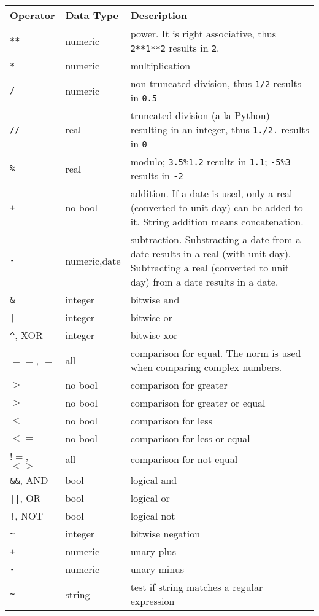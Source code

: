 \begin{tabular}{lp{2cm}p{10cm}}
  Operator & Data Type & Description \\ \hline
  \texttt{**} & numeric & power. It is right associative, thus \texttt{2**1**2} results in
  \texttt{2}. \\
  \texttt{*} & numeric & multiplication \\
  \texttt{/} & numeric & non-truncated division, thus \texttt{1/2} results
  in \texttt{0.5} \\
  \texttt{//} & real & truncated division (a la Python)
 resulting in an integer, thus \texttt{1./2.} results in \texttt{0} \\
  \texttt{\%} & real & modulo; \texttt{3.5\%1.2} results in
  \texttt{1.1}; \texttt{-5\%3} results in \texttt{-2} \\
  \texttt{+} & no bool & addition. If a date is
  used, only a real (converted to unit day) can be added to it. String addition means
  concatenation. \\
  \texttt{-} & numeric,date & subtraction. Substracting a date from a
  date results in a real (with unit day). Subtracting a real
  (converted to unit day) from a date results in a date. \\
  \texttt{\&} & integer & bitwise and \\
  \verb+|+ & integer & bitwise or \\
  \verb+^+, XOR & integer & bitwise xor \\
  $==$, $=$& all & comparison for equal. The norm is used when
  comparing complex numbers. \\
  $>$ & no bool & comparison for greater \\
  $>=$ & no bool & comparison for greater or equal \\
  $<$ & no bool & comparison for less \\
  $<=$ & no bool & comparison for less or equal \\
  $!=$, $<>$ & all & comparison for not equal \\
  \texttt{\&\&}, AND & bool & logical and \\
  \verb+||+, OR & bool & logical or \\
  \texttt{!}, NOT & bool & logical not \\
  \verb+~+ & integer & bitwise negation \\
  \texttt{+} & numeric & unary plus \\
  \texttt{-} & numeric & unary minus \\
  \verb+~+ & string & test if string matches a regular expression

\end{tabular}
